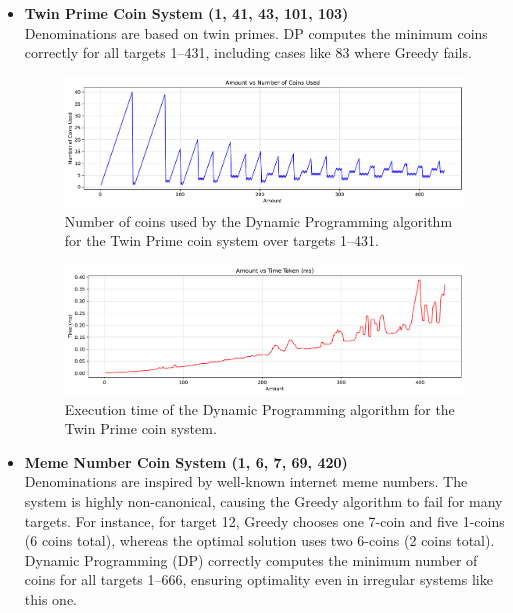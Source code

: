 \documentclass[12pt,a4paper]{report}
\begin{document}
\begin{itemize}
    \item \textbf{Twin Prime Coin System (1, 41, 43, 101, 103)}\\
    Denominations are based on twin primes. DP computes the minimum coins correctly for all targets 1--431, including cases like 83 where Greedy fails.\\
    \begin{figure}[H]
      \centering
      \includegraphics[width=\textwidth]{graphs/dp_coins_twin_prime_plot.pdf}
      \caption{Number of coins used by the Dynamic Programming algorithm for the Twin Prime coin system over targets 1--431.}
      \label{fig:dp_coins_twin_prime_plot}
    \end{figure}
    \begin{figure}[H]
      \centering
      \includegraphics[width=\textwidth]{graphs/dp_time_twin_prime_plot.pdf}
      \caption{Execution time of the Dynamic Programming algorithm for the Twin Prime coin system.}
      \label{fig:dp_time_twin_prime_plot}
    \end{figure}

\item \textbf{Meme Number Coin System (1, 6, 7, 69, 420)}\\
Denominations are inspired by well-known internet meme numbers. The system is highly non-canonical, causing the Greedy algorithm to fail for many targets. For instance, for target 12, Greedy chooses one 7-coin and five 1-coins (6 coins total), whereas the optimal solution uses two 6-coins (2 coins total).\\
Dynamic Programming (DP) correctly computes the minimum number of coins for all targets 1--666, ensuring optimality even in irregular systems like this one.\\


\end{itemize}
\end{document}
